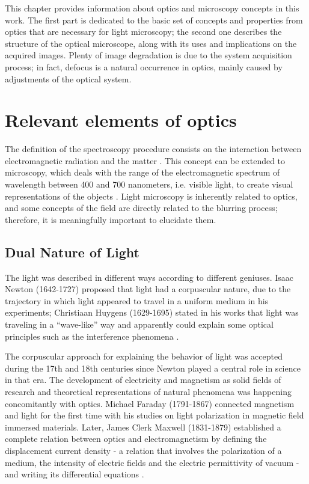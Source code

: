 This chapter provides information about optics and microscopy concepts in this work. The first part is dedicated to the basic set of concepts and properties from optics that are necessary for light microscopy; the second one describes the structure of the optical microscope, along with its uses and implications on the acquired images. Plenty of image degradation is due to the system acquisition process; in fact, defocus is a natural occurrence in optics, mainly caused by adjustments of the optical system.


\section{Relevant elements of optics}

The definition of the spectroscopy procedure consists on the interaction between electromagnetic radiation and the matter \cite{gauglitz2006handbook}. This concept can be extended to microscopy, which deals with the range of the electromagnetic spectrum of wavelength between 400 and 700 nanometers, i.e. visible light,  to create visual representations of the objects
\cite{bell2009introduction}. Light microscopy is inherently related to optics, and some concepts of the field are directly related to the blurring process; therefore, it is meaningfully important to elucidate them.

\subsection{Dual Nature of Light}

The light was described in different ways according to different geniuses. Isaac Newton (1642-1727) proposed that light had a corpuscular nature, due to the trajectory in which light appeared to travel in a uniform medium in his experiments; Christiaan Huygens (1629-1695) stated in his works that light was traveling in a ``wave-like'' way and apparently could explain some optical principles such as the interference phenomena \cite{fowles1989introduction}. 

The corpuscular approach for explaining the behavior of light was accepted during the 17th and 18th centuries since Newton played a central role in science in that era. The development of electricity and magnetism as solid fields of research and theoretical representations of natural phenomena was happening concomitantly with optics. Michael Faraday (1791-1867) connected magnetism and light for the first time with his studies on light polarization in magnetic field immersed materials. Later, James Clerk Maxwell (1831-1879) established a complete relation between optics and electromagnetism by defining the displacement current density - a relation that involves the polarization of a medium, the intensity of electric fields and the electric permittivity of vacuum - and writing its differential equations \cite{zilio2009optica}.

